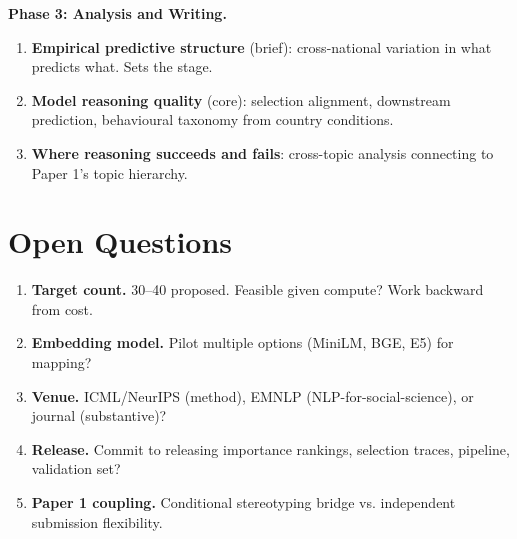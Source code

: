 \documentclass[11pt]{article}
\begin{document}
\textbf{Phase 3: Analysis and Writing.}

\begin{enumerate}[noitemsep]
    \item \textbf{Empirical predictive structure} (brief): cross-national variation in what predicts what. Sets the stage.
    \item \textbf{Model reasoning quality} (core): selection alignment, downstream prediction, behavioural taxonomy from country conditions.
    \item \textbf{Where reasoning succeeds and fails}: cross-topic analysis connecting to Paper 1's topic hierarchy.
\end{enumerate}


\section{Open Questions}

\begin{enumerate}[noitemsep]
    \item \textbf{Target count.} 30--40 proposed. Feasible given compute? Work backward from cost.
    \item \textbf{Embedding model.} Pilot multiple options (MiniLM, BGE, E5) for mapping?
    \item \textbf{Venue.} ICML/NeurIPS (method), EMNLP (NLP-for-social-science), or journal (substantive)?
    \item \textbf{Release.} Commit to releasing importance rankings, selection traces, pipeline, validation set?
    \item \textbf{Paper 1 coupling.} Conditional stereotyping bridge vs. independent submission flexibility.
\end{enumerate}




\end{document}
